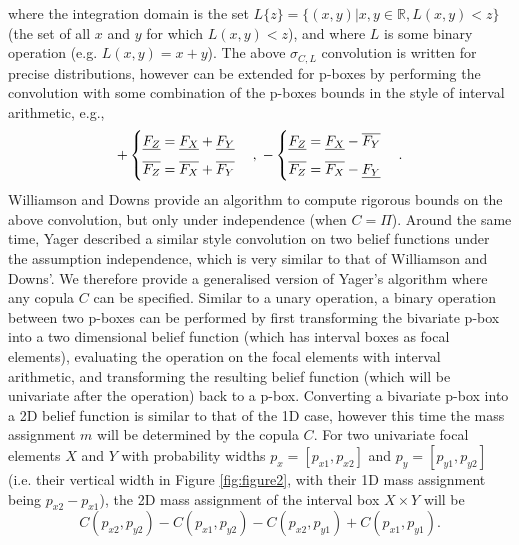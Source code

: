 \documentclass{juliacon}
\begin{document}
where the integration domain is the set $L\{z\} = \{(x,y)| x,y \in \mathbb{R}, L(x,y) < z\}$ (the set of all $x$ and $y$ for which $L(x,y) < z$), and where $L$ is some binary operation (e.g. $L(x,y) = x+y$). The above $\sigma_{C,L}$ convolution is written for precise distributions, however can be extended for p-boxes by performing the convolution with some combination of the p-boxes bounds in the style of interval arithmetic, e.g.,
\begin{eqnarray*}
  + 
  \begin{cases}
    \underline{F_Z} = \underline{F_X} + \underline{F_Y} \vspace{2mm}\\
    \overline{F_Z} = \overline{F_X} + \overline{F_Y}
  \end{cases},\;
  -\begin{cases}
    \underline{F_Z} = \underline{F_X} - \overline{F_Y}\vspace{2mm}\\
    \overline{F_Z} = \overline{F_X} - \underline{F_Y}
  \end{cases} .
\end{eqnarray*}
Williamson and Downs provide an algorithm to compute rigorous bounds on the above convolution, but only under independence (when $C = \Pi$). Around the same time, Yager \cite{yager1986arithmetic} described a similar style convolution on two belief functions under the assumption independence, which is very similar to that of Williamson and Downs'. We therefore provide a generalised version of Yager's algorithm where any copula $C$ can be specified. Similar to a unary operation, a binary operation between two p-boxes can be performed by first transforming the bivariate p-box into a two dimensional belief function (which has interval boxes as focal elements), evaluating the operation on the focal elements with interval arithmetic, and transforming the resulting belief function (which will be univariate after the operation) back to a p-box. Converting a bivariate p-box into a 2D belief function is similar to that of the 1D case, however this time the mass assignment $m$ will be determined by the copula $C$. For two univariate focal elements $X$ and $Y$ with probability widths $p_{x} = [p_{x1}, p_{x2}]$ and $p_{y} = [p_{y1}, p_{y2}]$ (i.e. their vertical width in Figure \ref{fig:figure2}, with their 1D mass assignment being $p_{x2} - p_{x1}$), the 2D mass assignment of the interval box $X \times Y$ will be
\begin{equation*}
  C(p_{x2}, p_{y2}) - C(p_{x1}, p_{y2}) - C(p_{x2}, p_{y1}) + C(p_{x1}, p_{y1}) .
\end{equation*}
\end{document}
